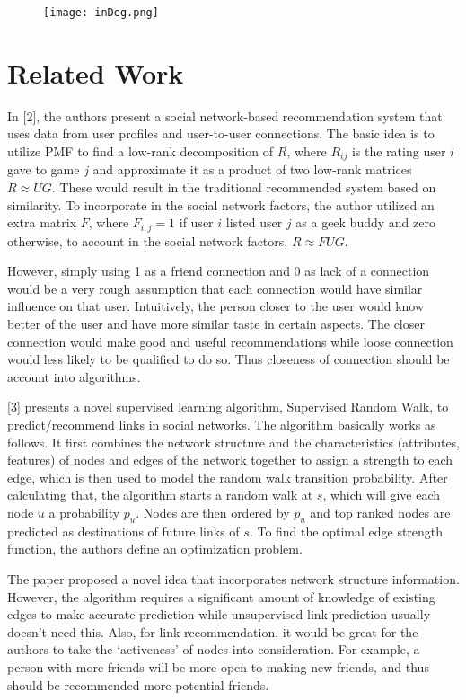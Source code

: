 \documentclass{article}
\begin{document}
\begin{figure}[h]
\begin{center}
\texttt{[image: inDeg.png]}

\label{fig:degdis}
\end{center}
\end{figure}


\section{Related Work}

In [2], the authors present a social network-based recommendation system that uses data from user profiles and user-to-user connections. 
The basic idea is to utilize PMF to find a low-rank decomposition of $R$, where $R_{ij}$ is the rating user $i$ gave to game $j$ and approximate it as a product of two low-rank matrices $R\approx UG$. These would result in the traditional recommended system based on similarity. To incorporate in the social network factors, the author utilized an extra matrix $F$, where $F_{i,j} = 1$ if user $i$ listed user $j$ as a geek buddy and zero otherwise, to account in the social network factors, $R\approx FUG $.

However, simply using 1 as a friend connection and 0 as lack of a connection would be a very rough assumption that each connection would have similar influence on that user. Intuitively, the person closer to the user would know better of the user and have more similar taste in certain aspects. The closer connection would make good and useful recommendations while loose connection would less likely to be qualified to do so. Thus closeness of connection should be account into algorithms.


[3] presents a novel supervised learning algorithm, Supervised Random Walk, to predict/recommend links in social networks. The algorithm basically works as follows. It first combines the network structure and the characteristics (attributes, features) of nodes and edges of the network together to assign a strength to each edge, which is then used to model the random walk transition probability. After calculating that, the algorithm starts a random walk at $s$, which will give each node $u$ a probability $p_u$. Nodes are then ordered by $p_u$ and top ranked nodes are predicted as destinations of future links of $s$. To find the optimal edge strength function, the authors define an optimization problem. 

The paper proposed a novel idea that incorporates network structure information. However, the algorithm requires a significant amount of knowledge of existing edges to make accurate prediction while unsupervised link prediction usually doesn’t need this. Also, for link recommendation, it would be great for the authors to take the ‘activeness’ of nodes into consideration. For example, a person with more friends will be more open to making new friends, and thus should be recommended more potential friends.
\end{document}
